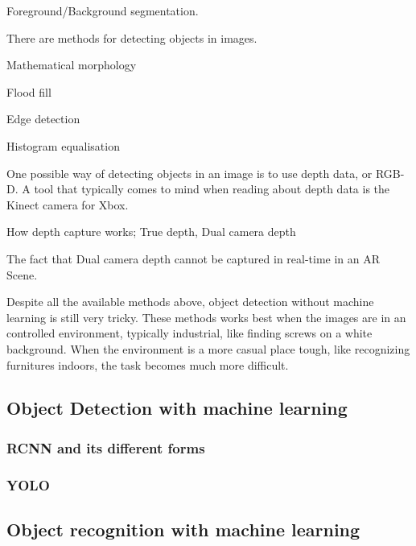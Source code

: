 Foreground/Background segmentation.

There are methods for detecting objects in images. 

Mathematical morphology

Flood fill

Edge detection

Histogram equalisation

One possible way of detecting objects in an image is to use depth data, or RGB-D.
A tool that typically comes to mind when reading about depth data is the Kinect camera
for Xbox.

How depth capture works; True depth, Dual camera depth

The fact that Dual camera depth cannot be captured in real-time in an AR Scene.

Despite all the available methods above, object detection without machine learning is still very tricky. These methods works best when the images are in an controlled environment, typically industrial, like finding screws on a white background.
When the environment is a more casual place tough, like recognizing furnitures indoors, the task becomes much more difficult.

\subsection{Object Detection with machine learning}

\subsubsection{RCNN and its different forms}

\subsubsection{YOLO}

\subsection{Object recognition with machine learning}


\newpage
